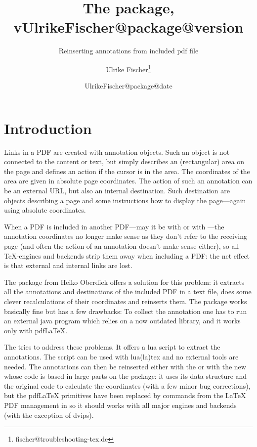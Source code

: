 \documentclass[DIV=12,parskip=half-,bibliography=totoc]{scrartcl}
\title{The \pkg{newpax} package, v\csname UlrikeFischer@package@version\endcsname}
\subtitle{Reinserting annotations from included pdf file}
\date{\csname UlrikeFischer@package@date\endcsname}
\author{Ulrike Fischer\thanks{fischer@troubleshooting-tex.de}}
\begin{document}
\maketitle

\section{Introduction}

Links in a PDF are created with annotation objects. Such an object is not connected to the content
or text, but simply describes an (rectangular) area on the page and defines an action if the
cursor is in the area. The coordinates of the area are given in absolute page coordinates.
The action of such an annotation can be an external URL, but also an internal destination.
Such destination are objects describing a page and some instructions how to display the page---again using absolute coordinates.

When a PDF is included in another PDF---may it be with  or with \hspace{0pt}---\hspace{0pt}the annotation coordinates no longer make sense as they don't refer to the receiving page (and often the action of an annotation doesn't make sense either), so all TeX-engines and backends strip them away when including a PDF: the net effect is that external and internal links are lost.

The  package from Heiko Oberdiek offers a solution for this problem: it extracts all the annotations
and destinations of the included PDF in a text file, does some clever recalculations of their coordinates and reinserts them.
The package works basically fine but has a few drawbacks: To collect the annotation one has to run an external
java program which relies on a now outdated library, and it works only with pdf\LaTeX{}.

The  tries to address these problems. It offers a lua script to extract the annotations.
The script can be used with lua(la)tex  and no external tools are needed. The annotations can
then be reinserted either with the  or with the new  whose code is based in large parts on the  package: it uses its data structure and the original code to calculate the coordinates (with a few minor bug corrections), but the pdf\LaTeX{} primitives have been replaced by commands from the \LaTeX{} PDF management in  so it should works with all major engines and backends (with the exception of dvips).
\end{document}
